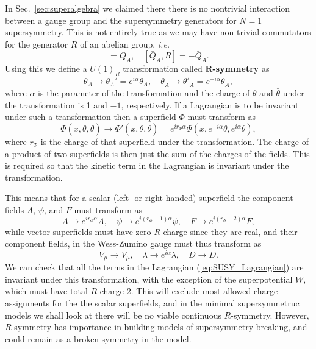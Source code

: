 \documentclass[notes.tex]{subfiles}
\begin{document}
In Sec.~\ref{sec:superalgebra} we claimed there there is no nontrivial interaction between a gauge group and the supersymmetry generators for $N=1$ supersymmetry. This is not entirely true as we may have non-trivial commutators for the generator $R$ of an abelian group, {\it i.e.}
\begin{equation}
[Q_A, R] = Q_A, \quad  [\bar Q_{\dot A}, R ] = -\bar Q_{\dot A}.
\end{equation}
Using this we define a $U(1)_R$ transformation called {\bf $\mathbf R$-symmetry} as
\begin{equation}
\theta_A \to \theta_A' = e^{i\alpha} \theta_A, \quad \bar\theta_{\dot A} \to  \bar\theta'_{\dot A}= e^{-i\alpha} \bar\theta_{\dot A},
\end{equation}
where $\alpha$ is the parameter of the transformation and the charge of $\theta$ and $\bar\theta$ under the transformation is 1 and $-1$, respectively.
If a Lagrangian is to be invariant under such a transformation then a superfield $\Phi$ must transform as
\begin{equation}
\Phi(x,\theta,\bar\theta)\to \Phi'(x,\theta,\bar\theta)= e^{ir_\Phi\alpha}\Phi(x,e^{-i\alpha} \theta,e^{i\alpha} \bar\theta),
\end{equation}
where $r_\Phi$ is the charge of that superfield under the transformation. The charge of a product of two superfields is then just the sum of the charges of the fields. This is required so that the kinetic term in the Lagrangian is invariant under the transformation.

This means that for a scalar (left- or right-handed) superfield the component fields $A$, $\psi$, and $F$ must transform as
\begin{equation}
A\to e^{ir_\Phi\alpha}A,\quad \psi\to e^{i(r_\Phi-1)\alpha} \psi,\quad F\to e^{i(r_\Phi-2)\alpha} F,
\end{equation}
while vector superfields must have zero $R$-charge since they are real, and their component fields, in the Wess-Zumino gauge must thus transform as
\begin{equation}
V_\mu \to V_\mu ,\quad \lambda \to e^{i\alpha} \lambda,\quad D\to D.
\end{equation}
We can check that all the terms in the Lagrangian (\ref{eq:SUSY_Lagrangian}) are invariant under this transformation, with the exception of the superpotential $W$, which must have total $R$-charge 2. This will exclude most allowed charge assignments for the the scalar superfields, and in the minimal supersymmetruc models we shall look at there will be no viable continuous $R$-symmetry. However, $R$-symmetry has importance in building models of supersymmetry breaking, and could remain as a broken symmetry in the model.
\end{document}
